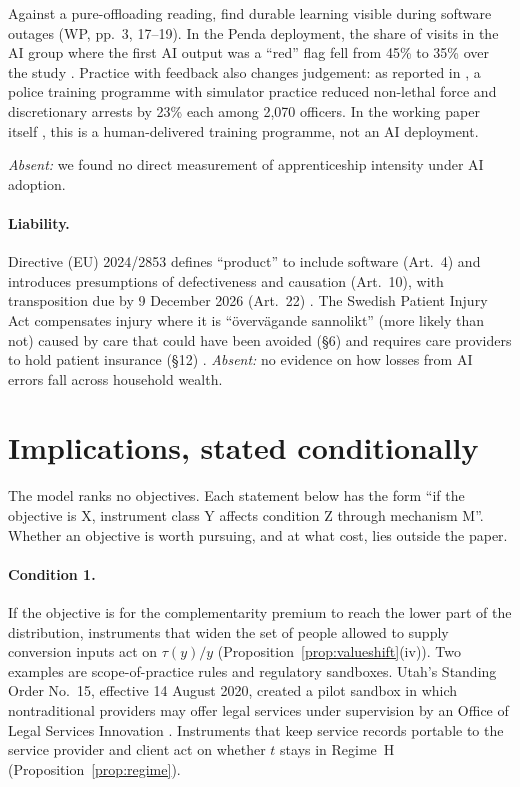 \documentclass[12pt]{article}
\theoremstyle{remark}
\begin{document}
Against a pure-offloading reading, \citet{brynjolfsson2025work} find durable learning visible during software outages (WP, pp.~3, 17--19). In the Penda deployment, the share of visits in the AI group where the first AI output was a ``red'' flag fell from 45\% to 35\% over the study \citep[p.~18]{korom2025penda}. Practice with feedback also changes judgement: as reported in \citet[p.~288]{ludwig2026reflective}, a police training programme with simulator practice reduced non-lethal force and discretionary arrests by 23\% each among 2,070 officers. In the working paper itself \citep[pp.~5, 31--32]{dube2025policing}, this is a human-delivered training programme, not an AI deployment.

\emph{Absent:} we found no direct measurement of apprenticeship intensity under AI adoption.

\paragraph{Liability.} Directive (EU) 2024/2853 defines ``product'' to include software (Art.~4) and introduces presumptions of defectiveness and causation (Art.~10), with transposition due by 9 December 2026 (Art.~22) \citep{eu2024pld}. The Swedish Patient Injury Act compensates injury where it is ``övervägande sannolikt'' (more likely than not) caused by care that could have been avoided (§6) and requires care providers to hold patient insurance (§12) \citep{sweden1996patient}. \emph{Absent:} no evidence on how losses from AI errors fall across household wealth.

\section{Implications, stated conditionally}\label{sec:implications}

The model ranks no objectives. Each statement below has the form ``if the objective is X, instrument class Y affects condition Z through mechanism M''. Whether an objective is worth pursuing, and at what cost, lies outside the paper.

\paragraph{Condition 1.} If the objective is for the complementarity premium to reach the lower part of the distribution, instruments that widen the set of people allowed to supply conversion inputs act on $\tau(y)/y$ (Proposition~\ref{prop:valueshift}(iv)). Two examples are scope-of-practice rules and regulatory sandboxes. Utah's Standing Order No.~15, effective 14 August 2020, created a pilot sandbox in which nontraditional providers may offer legal services under supervision by an Office of Legal Services Innovation \citep{utah2020so15}. Instruments that keep service records portable to the service provider and client act on whether $t$ stays in Regime~H (Proposition~\ref{prop:regime}).
\end{document}
